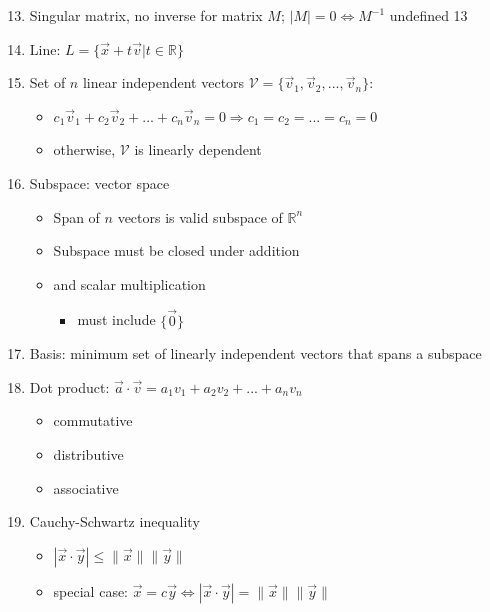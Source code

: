 \documentclass[10pt,letterpaper]{article}
\begin{document}
\begin{enumerate}
\setcounter{enumi}{12}
\item  Singular matrix, no inverse for matrix $M$; $|M|=0 \Leftrightarrow M ^{-1}$ undefined 13
\item Line: $L=\{\vec{x}+t \vec{v} | t \in \mathbb{R} \}$
\setcounter{enumi}{17}
\item  Set of $n$ linear independent vectors $\mathcal{V}=\{\vec{v}_1,\vec{v}_2,...,\vec{v}_n\}$:

\begin{itemize}
\item $c_1 \vec{v}_1 + c_2 \vec{v}_2 + ... + c_n \vec{v}_n=0 \Rightarrow c_1=c_2=...=c_n=0$
\item otherwise, $\mathcal{V}$ is linearly dependent
\end{itemize}

\item Subspace: vector space

\begin{itemize}
\item Span of $n$ vectors is valid subspace of $\mathbb{R}^n$
\item Subspace must be closed under addition
\item and scalar multiplication

\begin{itemize}
\item must include $\{\vec{0}\}$
\end{itemize}

\end{itemize}

\item Basis: minimum set of linearly independent vectors that spans a subspace
\item Dot product: $\vec{a} \cdot \vec{v}=a_1 v_1 + a_2 v_2 + ... + a_n v_n$

\begin{itemize}
\item commutative
\item distributive
\item associative
\end{itemize}

\setcounter{enumi}{22}
\item  Cauchy-Schwartz inequality

\begin{itemize}
\item $| \vec{x} \cdot \vec{y}| \le \| \vec{x} \| \| \vec{y} \|$
\item special case: $\vec{x}=c \vec{y} \Leftrightarrow | \vec{x} \cdot \vec{y}| = \| \vec{x} \| \| \vec{y} \|$
\end{itemize}


\end{enumerate}
\end{document}

